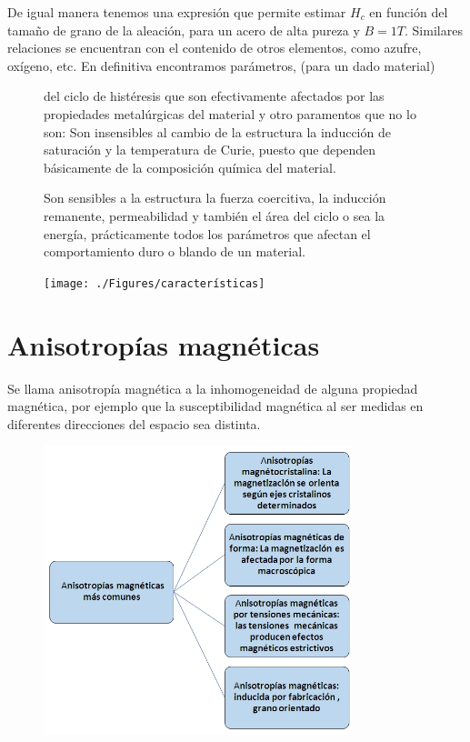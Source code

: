 De igual manera tenemos una expresión que permite estimar $H_{c}$ en función del tamaño de grano de la aleación, para un acero de alta pureza y $B=1T$. Similares relaciones se encuentran con el contenido de otros elementos, como azufre, oxígeno, etc. En definitiva encontramos parámetros, (para un dado material) 

\begin{figure}[H]
\begin{minipage}[b]{0.45\textwidth}
	\vspace{0pt}
del ciclo de histéresis que son efectivamente afectados por las propiedades metalúrgicas del material y otro paramentos que no lo son:
Son insensibles al cambio de la estructura la inducción de saturación y la temperatura de Curie, puesto que dependen básicamente de la composición química del material. 

Son sensibles a la estructura la fuerza coercitiva, la inducción remanente, permeabilidad y también el área del ciclo o sea la energía, prácticamente todos los parámetros que afectan el comportamiento duro o blando de un material.

\vspace{0.8cm}
\end{minipage}
\begin{minipage}[b]{0.50\linewidth}
	\raggedleft
    \texttt{[image: ./Figures/características]}
    \label{fig:características}
\end{minipage}

\end{figure}

\section{Anisotropías magnéticas}

Se llama anisotropía magnética a la inhomogeneidad de alguna propiedad magnética, por ejemplo que la susceptibilidad magnética al ser medidas en diferentes direcciones del espacio sea distinta.

\begin{figure}[H]
    \centering
    \includegraphics[width=0.8\textwidth]{./Figures/anhisotropiasMagneticas}
	\label{fig:anhisotropiasMagneticas.jpg}
\end{figure}


